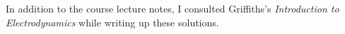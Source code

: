 \documentclass[11pt]{article}
\begin{document}
\newcommand{\vaa}{\vb{a}}
\newcommand{\vp}{\vb{p}}
\newcommand{\vr}{\vb{r}}
\newcommand{\vv}{\vb{v}}
\newcommand{\vx}{\vb{x}}
\newcommand{\vB}{\vb{B}}
\newcommand{\vE}{\vb{E}}
\newcommand{\vF}{\vb{F}}
\newcommand{\vJ}{\vb{J}}
\newcommand{\vomg}{\boldsymbol{\omega}}

\newcommand{\del}{\delta}
\newcommand{\vph}{\varphi}
\newcommand{\tht}{\theta}
\newcommand{\omg}{\omega}

\newcommand{\rhox}{\rho(x)}
\newcommand{\dcx}{\dd[3]{x}}

\newcommand{\cV}{\mathcal{V}}
\newcommand{\intcV}{\int_\cV}
\newcommand{\intS}{\int_S}
\newcommand{\dS}{\dd{S}}

\renewcommand{\xi}{x_i}
\newcommand{\limRi}{\lim_{R \to \infty}}

\newcommand{\nh}{\vb{\hat{n}}}
\newcommand{\rh}{\vb{\hat{r}}}
\newcommand{\xh}{\vb{\hat{x}}}
\newcommand{\yh}{\vb{\hat{y}}}
\newcommand{\zh}{\vb{\hat{z}}}
\newcommand{\phh}{\boldsymbol{\hat{\vph}}}
\newcommand{\thh}{\boldsymbol{\hat{\tht}}}





\renewcommand{\qq}{q_1}
\newcommand{\qw}{q_2}
\newcommand{\absx}{\abs{\vx}}
\newcommand{\tx}{(t, \vx)}

\newcommand{\rhoq}{\rho_1}
\newcommand{\vEq}{\vE_1}
\newcommand{\vpq}{\vp_1}
\newcommand{\vpqt}{\vpq(t)}
\newcommand{\vxq}{\vx_1}
\newcommand{\vxqt}{\vxq(t)}

\newcommand{\ret}{\text{ret}}
\newcommand{\xx}{x_x}
\newcommand{\xy}{x_y}





\newcommand{\Io}{I_0}
\newcommand{\tz}{(t, z)}

\newcommand{\dt}{\dd{t}}
\newcommand{\dx}{\dd{x}}
\newcommand{\dy}{\dd{y}}
\newcommand{\dz}{\dd{z}}
\newcommand{\intii}{\int_{-\infty}^\infty}
\newcommand{\intoL}{\int_0^L}





\vfill
In addition to the course lecture notes, I consulted Griffiths's \emph{Introduction to Electrodynamics} while writing up these solutions.
\end{document}
